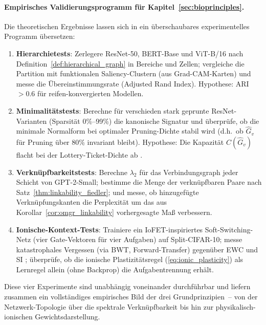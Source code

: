 ﻿\documentclass[12pt, a4paper, openany]{report}
\begin{document}
\paragraph{Empirisches Validierungsprogramm für Kapitel~\ref{sec:bioprinciples}.}
Die theoretischen Ergebnisse lassen sich in ein überschaubares
experimentelles Programm übersetzen:
\begin{enumerate}[label=(\alph*)]
  \item \textbf{Hierarchietests}: Zerlegere ResNet-50, BERT-Base und
    ViT-B/16 nach Definition~\ref{def:hierarchical_graph} in Bereiche und
    Zellen; vergleiche die Partition mit funktionalen Saliency-Clustern
    (aus Grad-CAM-Karten) und messe die Übereinstimmungs\-rate
    (Adjusted Rand Index).  Hypothese: ARI $> 0.6$ für reifen-konvergierten
    Modellen.
  \item \textbf{Minimalitätstests}: Berechne für verschieden stark geprunte
    ResNet-Varianten (Sparsität 0\%--99\%) die kanonische Signatur und
    überprüfe, ob die minimale Normal\-form bei optimaler Pruning-Dichte
    stabil wird (d.h.\ ob $\hat{G}_v$ für Pruning über 80\% invariant bleibt).
    Hypothese: Die Kapazität $C(\hat{G}_v)$ flacht bei der Lottery-Ticket-Dichte
    ab \cite{frankle19}.
  \item \textbf{Verknüpfbarkeitstests}: Berechne $\lambda_2$ für das
    Verbindungsgraph jeder Schicht von GPT-2-Small; bestimme die Menge der
    verknüpfbaren Paare nach Satz~\ref{thm:linkability_fiedler}; und messe,
    ob hinzugefügte Verknüpfungskanten die Perplexität um das aus
    Korollar~\ref{cor:omgr_linkability} vorhergesagte Maß verbessern.
  \item \textbf{Ionische-Kontext-Tests}: Trainiere ein
    IoFET-inspiriertes Soft-Switching-Netz (vier Gate-Vektoren für vier
    Aufgaben) auf Split-CIFAR-10; messe katastrophales Vergessen (via BWT,
    Forward-Transfer) gegenüber EWC \cite{kirkpatrick17} und SI \cite{zenke17};
    überprüfe, ob die ionische Plastizitäts\-regel (\cref{eq:ionic_plasticity})
    als Lernregel allein (ohne Backprop) die Aufgaben\-trennung erhält.
\end{enumerate}
Diese vier Experimente sind unabhängig voneinander durchführbar und liefern
zusammen ein vollständiges empirisches Bild der drei Grundprinzipien~--
von der Netzwerk-Topologie über die spektrale Verknüpfbarkeit bis hin zur
physikalisch-ionischen Gewichtsdarstellung.
\end{document}
